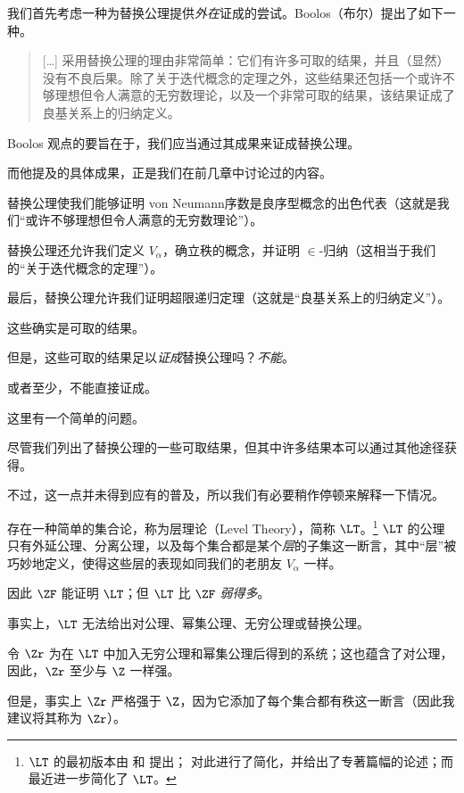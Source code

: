 \documentclass[../../../include/open-logic-section]{subfiles}
\begin{document}

我们首先考虑一种为替换公理提供\emph{外在}证成的尝试。Boolos（布尔）提出了如下一种。


\begin{quote}
  [\ldots] 采用替换公理的理由非常简单：它们有许多可取的结果，并且（显然）没有不良后果。除了关于迭代概念的定理之外，这些结果还包括一个或许不够理想但令人满意的无穷数理论，以及一个非常可取的结果，该结果证成了良基关系上的归纳定义。
  \citep[229]{Boolos1971}
\end{quote}

Boolos 观点的要旨在于，我们应当通过其成果来证成替换公理。

而他提及的具体成果，正是我们在前几章中讨论过的内容。

替换公理使我们能够证明 von Neumann序数是良序型概念的出色代表（这就是我们“或许不够理想但令人满意的无穷数理论”）。

替换公理还允许我们定义 $V_\alpha$，确立秩的概念，并证明 $\in$-归纳（这相当于我们的“关于迭代概念的定理”）。

最后，替换公理允许我们证明超限递归定理（这就是“良基关系上的归纳定义”）。

这些确实是可取的结果。

但是，这些可取的结果足以\emph{证成}替换公理吗？\emph{不能}。

或者至少，不能直接证成。

这里有一个简单的问题。

尽管我们列出了替换公理的一些可取结果，但其中许多结果本可以通过其他途径获得。

不过，这一点并未得到应有的普及，所以我们有必要稍作停顿来解释一下情况。

存在一种简单的集合论，称为层理论（Level Theory），简称 $\LT$。\footnote{$\LT$ 的最初版本由 \citet{Montague1965} 和 \citet{Scott1974} 提出；\citet{Potter2004} 对此进行了简化，并给出了专著篇幅的论述；而 \citet{ButtonLT1} 最近进一步简化了 $\LT$。} $\LT$ 的公理只有外延公理、分离公理，以及每个集合都是某个\emph{层}的子集这一断言，其中“层”被巧妙地定义，使得这些层的表现如同我们的老朋友 $V_\alpha$ 一样。

因此 $\ZF$ 能证明 $\LT$；但 $\LT$ 比 $\ZF$ \emph{弱得多}。

事实上，$\LT$ 无法给出对公理、幂集公理、无穷公理或替换公理。

令 $\Zr$ 为在 $\LT$ 中加入无穷公理和幂集公理后得到的系统；这也蕴含了对公理，因此，$\Zr$ 至少与 $\Z$ 一样强。

但是，事实上 $\Zr$ 严格强于 $\Z$，因为它添加了每个集合都有秩这一断言（因此我建议将其称为 $\Zr$）。
\end{document}
